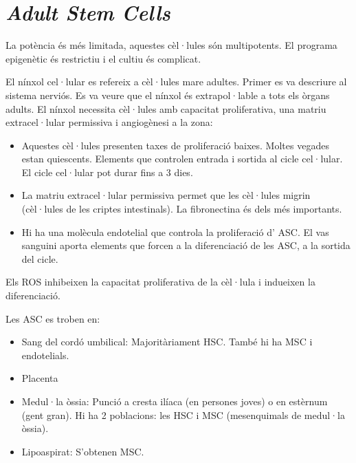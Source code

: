 \section{\textit{Adult Stem Cells}}

La potència és més limitada, aquestes cèl·lules són multipotents. El programa epigenètic és restrictiu i el cultiu és complicat.

El nínxol cel·lular es refereix a cèl·lules mare adultes. Primer es va descriure al sistema nerviós. Es va veure que el nínxol és extrapol·lable a tots els òrgans adults. El nínxol necessita cèl·lules amb capacitat proliferativa, una matriu extracel·lular permissiva i angiogènesi a la zona:
\begin{itemize}
\item Aquestes cèl·lules presenten taxes de proliferació baixes. Moltes vegades estan quiescents. Elements que controlen entrada i sortida al cicle cel·lular. El cicle cel·lular pot durar fins a 3 dies.

\item La matriu extracel·lular permissiva permet que les cèl·lules migrin (cèl·lules de les criptes intestinals). La fibronectina és dels més importants.

\item Hi ha una molècula endotelial que controla la proliferació d' ASC. El vas sanguini aporta elements que forcen a la diferenciació de les ASC, a la sortida del cicle.
\end{itemize}

Els ROS inhibeixen la capacitat proliferativa de la cèl·lula i indueixen la diferenciació.

Les ASC es troben en:
\begin{multicols}{2}
  \begin{itemize}
  \item Sang del cordó umbilical: Majoritàriament HSC. També hi ha MSC i endotelials.
  \item Placenta
  \item Medul·la òssia: Punció a cresta ilíaca (en persones joves) o en estèrnum (gent gran). Hi ha 2 poblacions: les HSC i MSC  (mesenquimals de medul·la òssia).
  \item Lipoaspirat: S'obtenen MSC.
  \end{itemize}
\end{multicols}

